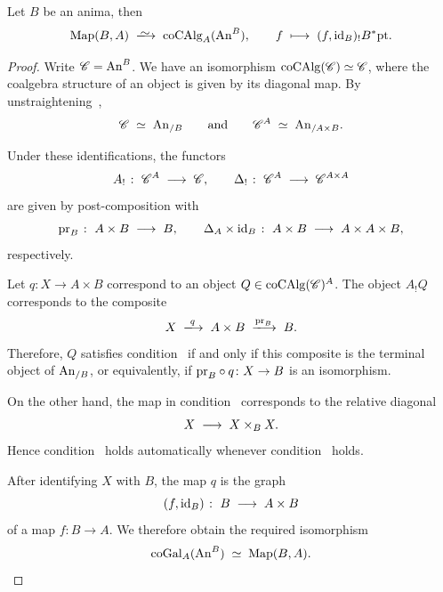 \documentclass[english,svgnames,table]{article}
\begin{document}
    \begin{example}
    \label{exm:coGal-in-spc}
        Let $B$ be an anima, then 
        \begin{equation*}
            \Map(B, A) \;\isotoo\; \coCAlg_A(\An^B), \qquad f \;\longmapsto\; (f,\id_B)_!B^*\pt.
        \end{equation*}
    \end{example}
    \begin{proof}
        Write $\mathscr{C} = \mathrm{An}^B$. We have an isomorphism $\operatorname{coCAlg}(\mathscr{C}) \simeq \mathscr{C}$, where the coalgebra structure of an object is given by its diagonal map. By unstraightening~\cite[Theorem~3.2.0.1]{Lurie-HTT},
        \begin{equation*}
            \mathscr{C} \;\simeq\; \mathrm{An}_{/B}
            \qquad \text{and} \qquad
            \mathscr{C}^A \;\simeq\; \mathrm{An}_{/A\times B}.
        \end{equation*}

        Under these identifications, the functors
        \begin{equation*}
            A_! \;\colon\; \mathscr{C}^A \;\longrightarrow\; \mathscr{C},
            \qquad
            \Delta_! \;\colon\; \mathscr{C}^A \;\longrightarrow\; \mathscr{C}^{A\times A}
        \end{equation*}
        are given by post-composition with
        \begin{equation*}
            \mathrm{pr}_B \;\colon\; A\times B \;\longrightarrow\; B,
            \qquad
            \Delta_A\times\mathrm{id}_B \;\colon\; A\times B
            \;\longrightarrow\; A\times A\times B,
        \end{equation*}
        respectively.
        
        Let $q \colon X\to A\times B$ correspond to an object
        $Q\in\operatorname{coCAlg}(\mathscr{C})^A$. The object $A_!Q$ corresponds to the composite
        \begin{equation*}
            X \;\xtoo{q}\; A\times B \;\xtoo{\pr_B}\; B.
        \end{equation*}
        Therefore, $Q$ satisfies condition~ if and only if this composite is the terminal object of $\mathrm{An}_{/B}$, or equivalently, if $\mathrm{pr}_B\circ q\colon X\to B$ is an isomorphism. 
    
        On the other hand, the map in condition~ corresponds to the relative diagonal
        \begin{equation*}
            X \;\longrightarrow\; X\times_B X.
        \end{equation*}
        Hence condition~ holds automatically whenever condition~ holds.
    
        After identifying $X$ with $B$, the map $q$ is the graph
        \begin{equation*}
            (f,\mathrm{id}_B) \;\colon\; B \;\longrightarrow\; A\times B
        \end{equation*}
        of a map $f\colon B\to A$. We therefore obtain the required isomorphism
        \begin{equation*}
            \mathrm{coGal}_A(\mathrm{An}^B) \;\simeq\; \operatorname{Map}(B,A). \qedhere
        \end{equation*}
    \end{proof}
    
\end{document}
